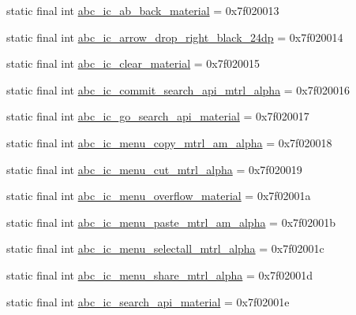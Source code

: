 \begin{CompactItemize}
static final int \hyperlink{classandroid_1_1support_1_1graphics_1_1drawable_1_1_r_1_1drawable_8e5129a2ec88542fc66e142b2b024988}{abc\_\-ic\_\-ab\_\-back\_\-material} = 0x7f020013
\item 
static final int \hyperlink{classandroid_1_1support_1_1graphics_1_1drawable_1_1_r_1_1drawable_b9b993b7be7797f5171551c7e0c9d990}{abc\_\-ic\_\-arrow\_\-drop\_\-right\_\-black\_\-24dp} = 0x7f020014
\item 
static final int \hyperlink{classandroid_1_1support_1_1graphics_1_1drawable_1_1_r_1_1drawable_06539ca8f865b08de304d25c79b3851a}{abc\_\-ic\_\-clear\_\-material} = 0x7f020015
\item 
static final int \hyperlink{classandroid_1_1support_1_1graphics_1_1drawable_1_1_r_1_1drawable_2be7fc519a86891bdb54d88ae16e9030}{abc\_\-ic\_\-commit\_\-search\_\-api\_\-mtrl\_\-alpha} = 0x7f020016
\item 
static final int \hyperlink{classandroid_1_1support_1_1graphics_1_1drawable_1_1_r_1_1drawable_70770705fecb71d99b9e2218a9274b9c}{abc\_\-ic\_\-go\_\-search\_\-api\_\-material} = 0x7f020017
\item 
static final int \hyperlink{classandroid_1_1support_1_1graphics_1_1drawable_1_1_r_1_1drawable_a1d8c17ca9ddc19cbf04d82bc588f7d4}{abc\_\-ic\_\-menu\_\-copy\_\-mtrl\_\-am\_\-alpha} = 0x7f020018
\item 
static final int \hyperlink{classandroid_1_1support_1_1graphics_1_1drawable_1_1_r_1_1drawable_e40b67ff8aafdea9f052ade968d144a5}{abc\_\-ic\_\-menu\_\-cut\_\-mtrl\_\-alpha} = 0x7f020019
\item 
static final int \hyperlink{classandroid_1_1support_1_1graphics_1_1drawable_1_1_r_1_1drawable_cc9020044f1786c7e2436b65de5b4355}{abc\_\-ic\_\-menu\_\-overflow\_\-material} = 0x7f02001a
\item 
static final int \hyperlink{classandroid_1_1support_1_1graphics_1_1drawable_1_1_r_1_1drawable_ec65ad7bb0ef545f45f348f20e8df8f9}{abc\_\-ic\_\-menu\_\-paste\_\-mtrl\_\-am\_\-alpha} = 0x7f02001b
\item 
static final int \hyperlink{classandroid_1_1support_1_1graphics_1_1drawable_1_1_r_1_1drawable_01ad1e00cc5d914d85b9a188363e1ec3}{abc\_\-ic\_\-menu\_\-selectall\_\-mtrl\_\-alpha} = 0x7f02001c
\item 
static final int \hyperlink{classandroid_1_1support_1_1graphics_1_1drawable_1_1_r_1_1drawable_39a8f0034bdad1390504b2bb2a22147c}{abc\_\-ic\_\-menu\_\-share\_\-mtrl\_\-alpha} = 0x7f02001d
\item 
static final int \hyperlink{classandroid_1_1support_1_1graphics_1_1drawable_1_1_r_1_1drawable_477c9b4f3b9d3c7c275aa72579d7a82b}{abc\_\-ic\_\-search\_\-api\_\-material} = 0x7f02001e

\end{CompactItemize}
